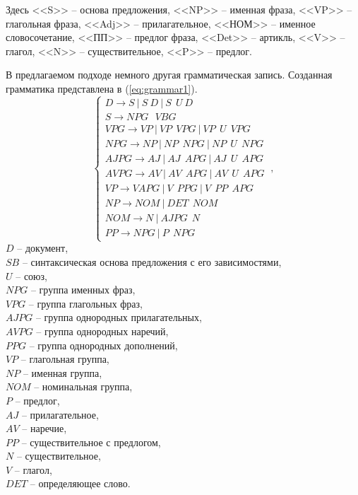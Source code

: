 \documentclass[../main]{subfiles}
\begin{document}
Здесь <<S>> -- основа предложения, <<NP>> -- именная фраза, <<VP>> -- глагольная фраза, <<Adj>> -- прилагательное, <<НОМ>> -- именное словосочетание, <<ПП>> -- предлог фраза, <<Det>> -- артикль, <<V>> -- глагол, <<N>> -- существительное, <<P>> -- предлог.

В предлагаемом подходе немного другая грамматическая запись. Созданная грамматика представлена в (\ref{eq:grammar1}). 
\begin{equation}
    \label{eq:grammar1}
    \left\{ 
        \begin{array}{l}
            D \rightarrow S\ |\ S\ D\ |\ S\ \ U\ D\ \\
            S \rightarrow NPG\ \ \ VBG \\
            VPG \rightarrow VP\ |\ VP\ \ VPG\ |\ VP\ \ U\ \ VPG \\
            NPG \rightarrow NP\ |\ NP\ \ NPG\ |\ NP\ \ U\ \ NPG \\
            AJPG \rightarrow AJ\ |\ AJ\ \ APG\ |\ AJ\ \ U\ \ APG \\
            AVPG \rightarrow AV\ |\ AV\ \ APG\ |\ AV\ \ U\ \ APG \\
            VP \rightarrow V APG\ |\ V\ \ PPG\ |\ V\ \ PP\ \ APG \\
            NP \rightarrow NOM\ |\ DET\ \ NOM \\
            NOM \rightarrow N\ |\ AJPG\ \ N \\
            PP \rightarrow NPG\ |\ P\ \ NPG
        \end{array}
    \right.\ ,
\end{equation}
$D$ -- документ,\\
\makebox[1.25cm]{}$SB$ -- синтаксическая основа предложения с его зависимостями,\\
\makebox[1.25cm]{}$U$ -- союз,\\
\makebox[1.25cm]{}$NPG$ -- группа именных фраз,\\
\makebox[1.25cm]{}$VPG$ -- группа глагольных фраз,\\
\makebox[1.25cm]{}$AJPG$ -- группа однородных прилагательных,\\
\makebox[1.25cm]{}$AVPG$ -- группа однородных наречий,\\
\makebox[1.25cm]{}$PPG$ -- группа однородных дополнений,\\
\makebox[1.25cm]{}$VP$ -- глагольная группа,\\
\makebox[1.25cm]{}$NP$ -- именная группа,\\
\makebox[1.25cm]{}$NOM$ -- номинальная группа,\\
\makebox[1.25cm]{}$P$ -- предлог,\\
\makebox[1.25cm]{}$AJ$ -- прилагательное,\\
\makebox[1.25cm]{}$AV$ -- наречие,\\
\makebox[1.25cm]{}$PP$ -- существительное с предлогом,\\
\makebox[1.25cm]{}$N$ -- существительное,\\
\makebox[1.25cm]{}$V$ -- глагол,\\
\makebox[1.25cm]{}$DET$ -- определяющее слово.
\end{document}
